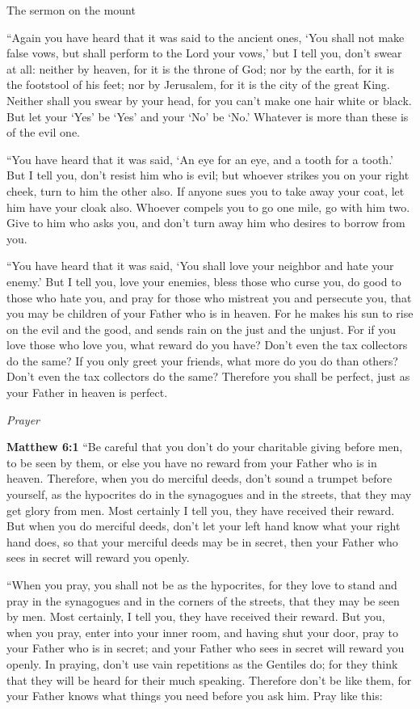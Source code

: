 \documentclass[10pt,twoside]{article} %
\newcommand{\quotesize}{\normalsize{}}
\newenvironment{quotetext}{\begingroup\quotesize}{\endgroup}
\newcommand{\bible}[2]{\begin{quotetext}\textbf{#1} #2\end{quotetext}}
\newcommand{\matthew}[2]{\bible{Matthew #1}{#2}}
\newcommand{\subhead}[1]{\emph{#1}\par}
\begin{document}
\begin{section}{The sermon on the mount}
{   ``Again you have heard that it was said to the ancient ones, `You shall not make false vows, but shall perform to the Lord your vows,'    but I tell you, don't swear at all: neither by heaven, for it is the throne of God;    nor by the earth, for it is the footstool of his feet; nor by Jerusalem, for it is the city of the great King.    Neither shall you swear by your head, for you can't make one hair white or black.    But let your `Yes' be `Yes' and your `No' be `No.' Whatever is more than these is of the evil one.

   ``You have heard that it was said, `An eye for an eye, and a tooth for a tooth.'    But I tell you, don't resist him who is evil; but whoever strikes you on your right cheek, turn to him the other also.    If anyone sues you to take away your coat, let him have your cloak also.    Whoever compels you to go one mile, go with him two.    Give to him who asks you, and don't turn away him who desires to borrow from you.

   ``You have heard that it was said, `You shall love your neighbor  and hate your enemy.'    But I tell you, love your enemies, bless those who curse you, do good to those who hate you, and pray for those who mistreat you and persecute you,    that you may be children of your Father who is in heaven. For he makes his sun to rise on the evil and the good, and sends rain on the just and the unjust.    For if you love those who love you, what reward do you have? Don't even the tax collectors do the same?    If you only greet your friends, what more do you do than others? Don't even the tax collectors do the same?    Therefore you shall be perfect, just as your Father in heaven is perfect.
}

\subhead{Prayer}

\matthew{6:1}{
    ``Be careful that you don't do your charitable giving before men, to be seen by them, or else you have no reward from your Father who is in heaven.    Therefore, when you do merciful deeds, don't sound a trumpet before yourself, as the hypocrites do in the synagogues and in the streets, that they may get glory from men. Most certainly I tell you, they have received their reward.    But when you do merciful deeds, don't let your left hand know what your right hand does,    so that your merciful deeds may be in secret, then your Father who sees in secret will reward you openly.

   ``When you pray, you shall not be as the hypocrites, for they love to stand and pray in the synagogues and in the corners of the streets, that they may be seen by men. Most certainly, I tell you, they have received their reward.    But you, when you pray, enter into your inner room, and having shut your door, pray to your Father who is in secret; and your Father who sees in secret will reward you openly.    In praying, don't use vain repetitions as the Gentiles do; for they think that they will be heard for their much speaking.    Therefore don't be like them, for your Father knows what things you need before you ask him.    Pray like this:
}


\end{section}
\end{document}
